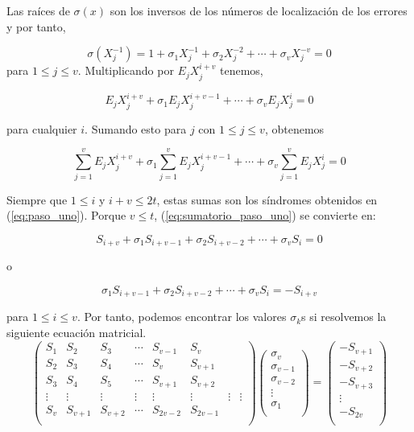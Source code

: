 Las raíces de $\sigma(x)$ son los inversos de los números de localización de los errores y por tanto, 

\[ 
\sigma(X_j^{-1}) = 1 + \sigma_1X_j^{-1} + \sigma_2X_j^{-2} + \cdots + 	\sigma_vX_j^{-v} = 0
\]
 para $ 1 \leq j \leq v$. Multiplicando por $E_jX_j^{i+v}$ tenemos,
 
 \[ 
 E_jX_j^{i+v} + \sigma_1E_jX_j^{i+v-1} + \cdots + \sigma_vE_jX_j^{i} = 0
 \]

para cualquier $i$. Sumando esto para $j$ con $1 \leq j \leq v$, obtenemos 

\begin{equation}
\label{eq:sumatorio_paso_uno}
 \sum_{j=1}^v E_jX_j^{i+v} + \sigma_1\sum_{j=1}^v E_jX_j^{i+v-1} + \cdots + \sigma_v\sum_{j=1}^v E_jX_j^{i} = 0
\end{equation}

Siempre que $ 1 \leq i$ y $i+v \leq 2t$, estas sumas son los síndromes obtenidos en (\ref{eq:paso_uno}). Porque $ v \leq t$, (\ref{eq:sumatorio_paso_uno}) se convierte en:

\[ 
S_{i+v} + \sigma_1S_{i+v-1} + \sigma_2S_{i+v-2} + \cdots + \sigma_vS_i = 0
\]

o 

\begin{equation}
\label{eq:sindromes_paso_uno}
 \sigma_1S_{i+v-1} + \sigma_2S_{i+v-2} + \cdots + \sigma_vS_i = - S_{i+v} 
\end{equation}

para $ 1 \leq i \leq v$. Por tanto, podemos encontrar los valores $\sigma_k$s si resolvemos la siguiente ecuación matricial.
\begin{equation}
\label{eq:sistema_matricial}
\begin{pmatrix}
			S_1 & S_2 & S_3 & \cdots & S_{v-1} & S_v \\
			S_2 & S_3 & S_4 & \cdots  & S_v & S_{v+1} \\
			S_3 & S_4 & S_5 & \cdots & S_{v+1} & S_{v+2} \\ 
 			\vdots & \vdots & \vdots & \vdots & \vdots &\vdots & \vdots & \vdots \\
			S_v & S_{v+1} & S_{v+2} & \cdots  & S_{2v-2} & S_{2v-1} \\
	\end{pmatrix}
	\begin{pmatrix}
			\sigma_v \\
			\sigma_{v-1} \\
			\sigma_{v-2}  \\ 
 			\vdots \\
			\sigma_1  \\
	\end{pmatrix} = \begin{pmatrix}
			-S_{v+1} \\
			-S_{v+2} \\
			-S_{v+3}  \\ 
 			\vdots \\
			-S_{2v}  \\
	\end{pmatrix}
\end{equation}

